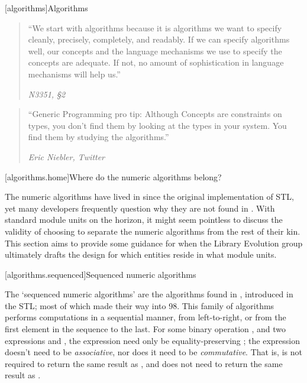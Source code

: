 [algorithms]{Algorithms}

\begin{quote}
``We start with algorithms because it is algorithms we want to specify cleanly, precisely,
completely, and readably. If we can specify algorithms well, our concepts and the language
mechanisms we use to specify the concepts are adequate. If not, no amount of sophistication in
language mechanisms will help us.''
\begin{flushright}
\textemdash \textit{N3351, \S{}2}
\end{flushright}
\end{quote}

\begin{quote}
``Generic Programming pro tip: Although Concepts are constraints on types, you don't find them by
looking at the types in your system. You find them by studying the algorithms.''
\begin{flushright}
\textemdash \textit{Eric Niebler, Twitter}
\end{flushright}
\end{quote}

[algorithms.home]{Where do the numeric algorithms belong?}

The numeric algorithms have lived in  since the original implementation of STL, yet
many developers frequently question why they are not found in . With standard
module units on the horizon, it might seem pointless to discuss the validity of choosing to separate
the numeric algorithms from the rest of their kin. This section aims to provide some guidance for
when the Library Evolution group ultimately drafts the design for which entities reside in what module
units.


[algorithms.sequenced]{Sequenced numeric algorithms}

The `sequenced numeric algorithms' are the algorithms found in , introduced in the
STL; most of which made their way into \Cpp{}98. This family of algorithms performs computations in
a sequential manner, from left-to-right, or from the first element in the sequence to the last.
For some binary operation , and two expressions  and , the expression
 need only be equality-preserving ; the expression
 doesn't need to be \textit{associative}, nor does it need to be
\textit{commutative}. That is,  is not required to return the same result
as , and  does not need to return the same result as
.

